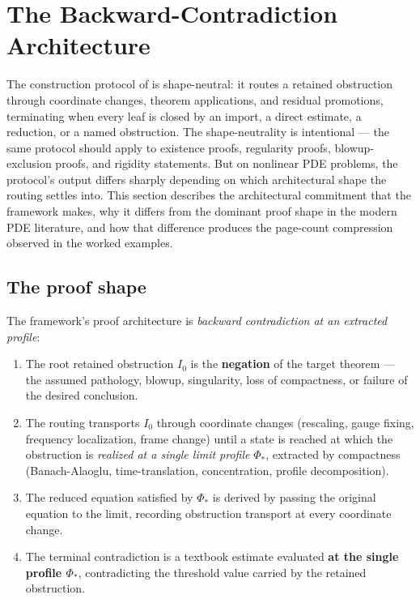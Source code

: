 \documentclass[11pt]{article}
\theoremstyle{plain}
\theoremstyle{definition}
\theoremstyle{remark}
\begin{document}
\section{The Backward-Contradiction Architecture}
\label{sec:backward-contradiction}

The construction protocol of  is
shape-neutral: it routes a retained obstruction through coordinate changes,
theorem applications, and residual promotions, terminating when every leaf is
closed by an import, a direct estimate, a reduction, or a named obstruction.
The shape-neutrality is intentional — the same protocol should apply to
existence proofs, regularity proofs, blowup-exclusion proofs, and rigidity
statements. But on nonlinear PDE problems, the protocol's output differs
sharply depending on which architectural shape the routing settles into. This
section describes the architectural commitment that the framework makes, why it
differs from the dominant proof shape in the modern PDE literature, and how that
difference produces the page-count compression observed in the worked examples.

\subsection{The proof shape}
\label{subsec:proof-shape}

The framework's proof architecture is \textit{backward contradiction at an
extracted profile}:

\begin{enumerate}
\item The root retained obstruction \(I_0\) is the \textbf{negation} of the
target theorem — the assumed pathology, blowup, singularity, loss of
compactness, or failure of the desired conclusion.

\item The routing transports \(I_0\) through coordinate changes (rescaling,
gauge fixing, frequency localization, frame change) until a state is reached at
which the obstruction is \textit{realized at a single limit profile}
\(\Phi_*\), extracted by compactness (Banach-Alaoglu, time-translation,
concentration, profile decomposition).

\item The reduced equation satisfied by \(\Phi_*\) is derived by passing the
original equation to the limit, recording obstruction transport at every
coordinate change.

\item The terminal contradiction is a textbook estimate evaluated \textbf{at
the single profile \(\Phi_*\)}, contradicting the threshold value carried by
the retained obstruction.
\end{enumerate}
\end{document}
